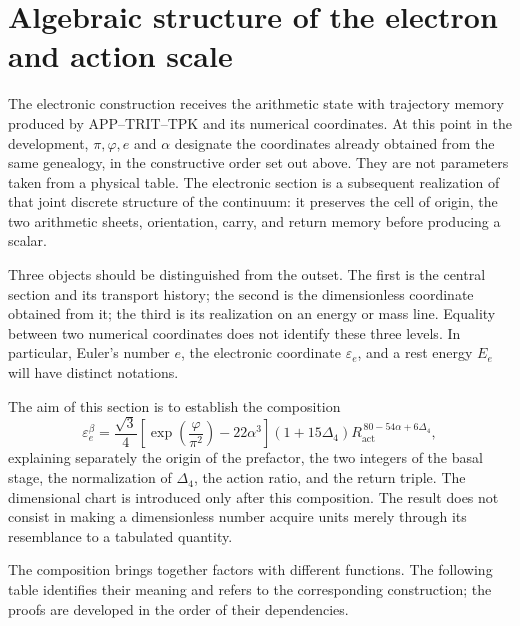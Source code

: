 \section{Algebraic structure of the electron and action scale}
\label{sec:electron}

The electronic construction receives the arithmetic state with
trajectory memory produced by APP--TRIT--TPK and its numerical coordinates. At this point in the development,
\(\pi,\varphi,e\) and \(\alpha\) designate the coordinates already obtained from
the same genealogy, in the constructive order set out above. They
are not parameters taken from a physical table. The electronic section is a
subsequent realization of that joint discrete structure of the continuum:
it preserves the cell of origin, the two arithmetic sheets, orientation,
carry, and return memory before producing a scalar.

Three objects should be distinguished from the outset. The first is the central
section and its transport history; the second is the dimensionless
coordinate obtained from it; the third is its realization on an
energy or mass line. Equality between two numerical coordinates does not
identify these three levels. In particular, Euler's number \(e\),
the electronic coordinate \(\varepsilon_e\), and a rest energy
\(E_e\) will have distinct notations.

The aim of this section is to establish the composition
\begin{equation}
 \varepsilon_e^{\beta}
 =\frac{\sqrt3}{4}
  \left[\exp\!\left(\frac{\varphi}{\pi^2}\right)-22\alpha^3\right]
  (1+15\Delta_4)
  R_{\mathrm{act}}^{\,80-54\alpha+6\Delta_4},
 \label{eq:el-formula-completa}
\end{equation}
explaining separately the origin of the prefactor, the two integers of the
basal stage, the normalization of \(\Delta_4\), the action ratio, and the
return triple. The dimensional chart is introduced only after
this composition. The result does not consist in making a
dimensionless number acquire units merely through its resemblance to a tabulated
quantity.

The composition brings together factors with different functions. The
following table identifies their meaning and refers to the corresponding
construction; the proofs are developed in the order of their dependencies.


